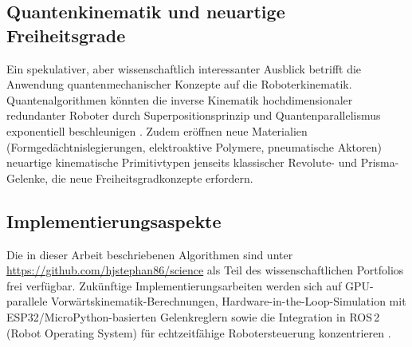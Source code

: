 ﻿\documentclass[a4paper,12pt]{article}
\theoremstyle{definition}
\begin{document}
\subsection{Quantenkinematik und neuartige Freiheitsgrade}

Ein spekulativer, aber wissenschaftlich interessanter Ausblick betrifft die Anwendung quantenmechanischer Konzepte auf die Roboterkinematik. Quantenalgorithmen könnten die inverse Kinematik hochdimensionaler redundanter Roboter durch Superpositionsprinzip und Quantenparallelismus exponentiell beschleunigen \cite{biamonte2017quantum}. Zudem eröffnen neue Materialien (Formgedächtnislegierungen, elektroaktive Polymere, pneumatische Aktoren) neuartige kinematische Primitivtypen jenseits klassischer Revolute- und Prisma-Gelenke, die neue Freiheitsgradkonzepte erfordern.

\subsection{Implementierungsaspekte}

Die in dieser Arbeit beschriebenen Algorithmen sind unter \url{https://github.com/hjstephan86/science} als Teil des wissenschaftlichen Portfolios frei verfügbar. Zukünftige Implementierungsarbeiten werden sich auf GPU-parallele Vorwärtskinematik-Berechnungen, Hardware-in-the-Loop-Simulation mit ESP32/MicroPython-basierten Gelenkreglern sowie die Integration in ROS\,2 (Robot Operating System) für echtzeitfähige Robotersteuerung konzentrieren \cite{quigley2009ros}.
\end{document}
